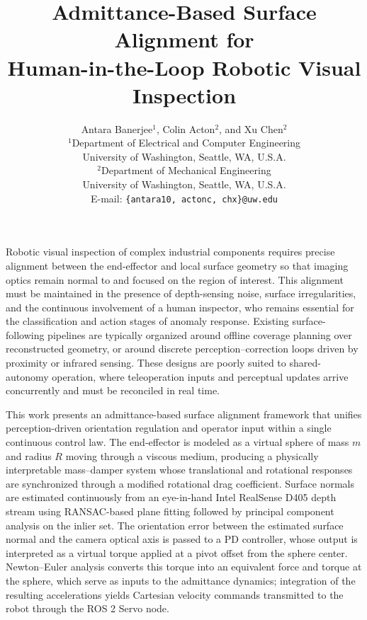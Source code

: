 \documentclass[a4,10pt]{article}
\begin{document}
\title{
Admittance-Based Surface Alignment for\\
Human-in-the-Loop Robotic Visual Inspection
}
\author{
Antara Banerjee${}^{1}$,
Colin Acton${}^{2}$, and
Xu Chen${}^{2}$ \\[1ex]
${}^1$Department of Electrical and Computer Engineering \\
University of Washington, Seattle, WA, U.S.A. \\
${}^2$Department of Mechanical Engineering \\
University of Washington, Seattle, WA, U.S.A. \\
E-mail: \texttt{\{antara10, actonc, chx\}@uw.edu}
}
\maketitle
\thispagestyle{empty}

Robotic visual inspection of complex industrial components requires precise alignment between the end-effector and local surface geometry so that imaging optics remain normal to and focused on the region of interest. This alignment must be maintained in the presence of depth-sensing noise, surface irregularities, and the continuous involvement of a human inspector, who remains essential for the classification and action stages of anomaly response. Existing surface-following pipelines are typically organized around offline coverage planning over reconstructed geometry, or around discrete perception--correction loops driven by proximity or infrared sensing. These designs are poorly suited to shared-autonomy operation, where teleoperation inputs and perceptual updates arrive concurrently and must be reconciled in real time.

This work presents an admittance-based surface alignment framework that unifies perception-driven orientation regulation and operator input within a single continuous control law. The end-effector is modeled as a virtual sphere of mass $m$ and radius $R$ moving through a viscous medium, producing a physically interpretable mass--damper system whose translational and rotational responses are synchronized through a modified rotational drag coefficient. Surface normals are estimated continuously from an eye-in-hand Intel RealSense D405 depth stream using RANSAC-based plane fitting followed by principal component analysis on the inlier set. The orientation error between the estimated surface normal and the camera optical axis is passed to a PD controller, whose output is interpreted as a virtual torque applied at a pivot offset from the sphere center. Newton--Euler analysis converts this torque into an equivalent force and torque at the sphere, which serve as inputs to the admittance dynamics; integration of the resulting accelerations yields Cartesian velocity commands transmitted to the robot through the ROS 2 Servo node.
\end{document}

